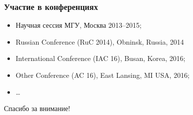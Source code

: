 \begin{frame}
    \frametitle{Участие в конференциях}
    \begin{itemize}
        \item Научная сессия МГУ, Москва 2013--2015;
        \item {} Russian Conference (RuC 2014), Obninsk, Russia, 2014
        \item {} International Conference (IAC 16), Busan, Korea,
              2016;
        \item {} Other Conference (AC 16), East Lansing, MI USA, 2016;
        \item \dots
    \end{itemize}
\end{frame}

\begin{frame} %
    \begin{center}
        \Huge
        Спасибо за внимание!
    \end{center}
\end{frame}
